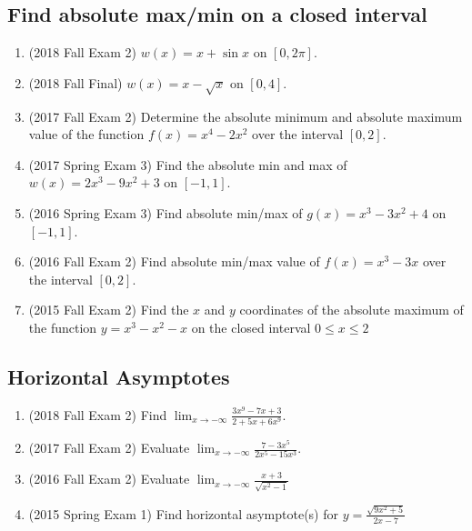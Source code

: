 \documentclass[10pt]{scrartcl}
\begin{document}
\subsection{Find absolute max/min on a closed interval}
\begin{enumerate}
\item (2018 Fall Exam 2) $w(x) = x + \sin x$ on $[0, 2\pi]$.
\item (2018 Fall Final) $w(x) = x - \sqrt{x}$ on $[0, 4]$.
\item (2017 Fall Exam 2) Determine the absolute minimum and absolute maximum value of the function $f(x) = x^4 - 2x^2$ over the interval $[0, 2]$.
\item (2017 Spring Exam 3) Find the absolute min and max of $w(x) = 2x^3 - 9x^2 + 3$ on $[-1, 1]$.
\item (2016 Spring Exam 3) Find absolute min/max of $g(x) = x^3 - 3x^2 + 4$ on $[-1, 1]$.
\item (2016 Fall Exam 2) Find absolute min/max value of $f(x) = x^3 - 3x$ over the interval $[0, 2]$.
\item (2015 Fall Exam 2) Find the $x$ and $y$ coordinates of the absolute maximum of the function $y = x^3 - x^2 - x$ on the closed interval $0 \le x \le 2$ 
\end{enumerate}

\subsection{Horizontal Asymptotes}
\begin{enumerate}
\item (2018 Fall Exam 2) Find $\lim_{x\to-\infty} \frac{3x^9 - 7x + 3}{2 + 5x + 6x^9}$.
\item (2017 Fall Exam 2) Evaluate $\lim_{x\to-\infty} \frac{7-3x^5}{2x^5-15x^3}$.
\item (2016 Fall Exam 2) Evaluate $\lim_{x\to-\infty} \frac{x+3}{\sqrt{x^2-1}}$
  \item (2015 Spring Exam 1) Find horizontal asymptote(s) for $y = \frac{\sqrt{9x^2+5}}{2x-7}$
\end{enumerate}
\end{document}
